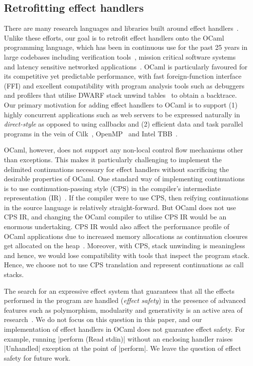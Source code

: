 \documentclass[sigplan,10pt,review,anonymous]{acmart}\settopmatter{printfolios=true,printccs=false,printacmref=false}
\begin{document}
\subsection{Retrofitting effect handlers}

There are many research languages and libraries built around effect
handlers~\cite{Koka,Links,Pyro,Frank,Eff}. Unlike these efforts, our goal is to
retrofit effect handlers onto the OCaml programming language, which has been in
continuous use for the past 25 years in large codebases including verification
tools~\cite{FStar,Coq}, mission critical software systems~\cite{astree} and
latency sensitive networked applications~\cite{JS,Docker,MirageOS}. OCaml is
particularly favoured for its competitive yet predictable performance, with
fast foreign-function interface (FFI) and excellent compatibility with program
analysis tools such as debuggers and profilers that utilise DWARF stack unwind
tables~\cite{DWARF} to obtain a backtrace. Our primary motivation for adding
effect handlers to OCaml is to support (1) highly concurrent applications such
as web servers to be expressed naturally in \emph{direct-style} as opposed to
using callbacks and (2) efficient data and task parallel programs in the vein
of Cilk~\cite{}, OpenMP~\cite{} and Intel TBB~\cite{}.

OCaml, however, does not support any non-local control flow mechanisms other
than exceptions. This makes it particularly challenging to implement the
delimited continuations necessary for effect handlers without sacrificing the
desirable properties of OCaml. One standard way of implementing continuations
is to use continuation-passing style (CPS) in the compiler's intermediate
representation (IR)~\cite{Koka}. If the compiler were to use CPS, then reifying
continuations in the source language is relatively straight-forward. But OCaml
does not use CPS IR, and changing the OCaml compiler to utilise CPS IR would be
an enormous undertaking. CPS IR would also affect the performance profile of
OCaml applications due to increased memory allocations as continuation closures
get allocated on the heap~\cite{Folklore}. Moreover, with CPS, stack unwinding
is meaningless and hence, we would lose compatibility with tools that inspect
the program stack. Hence, we choose not to use CPS translation and represent
continuations as call stacks.

The search for an expressive effect system that guarantees that all the effects
performed in the program are handled (\emph{effect safety}) in the presence of
advanced features such as polymorphism, modularity and generativity is an
active area of research~\cite{Leijen14, Biernacki19, Biernacki20,
Hillerstrom20}. We do not focus on this question in this paper, and our
implementation of effect handlers in OCaml does not guarantee effect safety.
For example, running |perform (Read stdin)| without an enclosing handler raises
|Unhandled| exception at the point of |perform|. We leave the question of
effect safety for future work.
\end{document}
